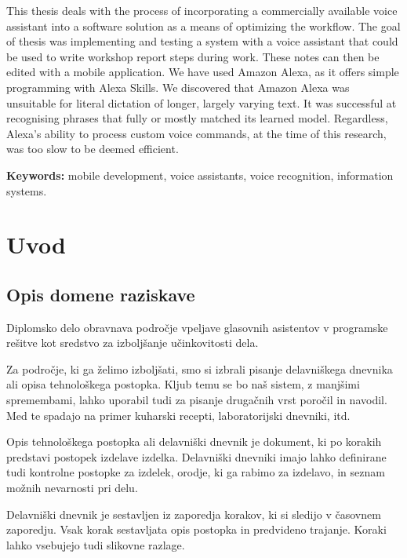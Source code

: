 \documentclass[a4paper, 12pt]{book}
\newcommand{\tkeywordsEn}{mobile development, voice assistants, voice recognition, information systems}
\newcommand{\clearemptydoublepage}{\newpage{\pagestyle{empty}\cleardoublepage}}
\begin{document}
\noindent This thesis deals with the process of incorporating a commercially available voice assistant into a software solution as a means of optimizing the workflow.
The goal of thesis was implementing and testing a system with a voice assistant that could be used to write workshop report steps during work.
These notes can then be edited with a mobile application.
We have used Amazon Alexa, as it offers simple programming with Alexa Skills.
We discovered that Amazon Alexa was unsuitable for literal dictation of longer, largely varying text.
It was successful at recognising phrases that fully or mostly matched its learned model.
Regardless, Alexa's ability to process custom voice commands, at the time of this research, was too slow to be deemed efficient.

\bigskip

\noindent\textbf{Keywords:} \tkeywordsEn.
\clearemptydoublepage

\mainmatter
\setcounter{page}{1}
\pagestyle{fancy}

\chapter{Uvod}
\section{Opis domene raziskave}

Diplomsko delo obravnava področje vpeljave glasovnih asistentov v programske rešitve kot sredstvo za izboljšanje učinkovitosti dela.

Za področje, ki ga želimo izboljšati, smo si izbrali pisanje delavniškega dnevnika ali opisa tehnološkega postopka.
Kljub temu se bo naš sistem, z manjšimi spremembami, lahko uporabil tudi za pisanje drugačnih vrst poročil in navodil.
Med te spadajo na primer kuharski recepti, laboratorijski dnevniki, itd.

Opis tehnološkega postopka ali delavniški dnevnik je dokument, ki po korakih predstavi postopek izdelave izdelka.
Delavniški dnevniki imajo lahko definirane tudi kontrolne postopke za izdelek, orodje, ki ga rabimo za izdelavo, in seznam možnih nevarnosti pri delu.

Delavniški dnevnik je sestavljen iz zaporedja korakov, ki si sledijo v časovnem zaporedju.
Vsak korak sestavljata opis postopka in predvideno trajanje.
Koraki lahko vsebujejo tudi slikovne razlage.
\end{document}
